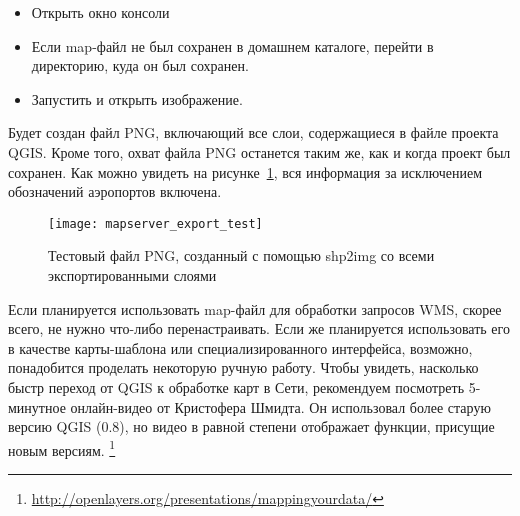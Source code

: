 \begin{itemize}[label=--]
\item Открыть окно консоли
\item Если map-файл не был сохранен в домашнем каталоге, перейти в
директорию, куда он был сохранен.
\item Запустить 
и открыть изображение.
\end{itemize}

Будет создан файл PNG, включающий все слои, содержащиеся в файле проекта
QGIS. Кроме того, охват файла PNG останется таким же, как и когда
проект был сохранен. Как можно увидеть на
рисунке~\ref{fig:mapserver_export_test}, вся информация за исключением
обозначений аэропортов включена.

\begin{figure}[ht]
\centering
  \texttt{[image: mapserver\_export\_test]}
  \caption{Тестовый файл PNG, созданный с помощью shp2img со всеми экспортированными слоями \wincaption}
  \label{fig:mapserver_export_test}
\end{figure}

Если планируется использовать map-файл для обработки запросов WMS,
скорее всего, не нужно что-либо перенастраивать. Если же планируется
использовать его в качестве карты-шаблона или специализированного
интерфейса, возможно, понадобится проделать некоторую ручную работу.
Чтобы увидеть, насколько быстр переход от QGIS к обработке карт в Сети,
рекомендуем посмотреть 5-минутное онлайн-видео от Кристофера Шмидта. Он
использовал более старую версию QGIS (0.8), но видео в равной
степени отображает функции, присущие новым версиям.
\footnote{\url{http://openlayers.org/presentations/mappingyourdata/}}

\FloatBarrier
